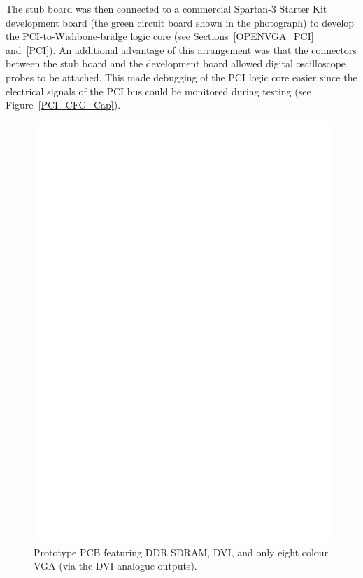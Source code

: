 The stub board was then connected to a commercial Spartan-3 Starter Kit
development board (the green circuit board shown in the photograph) to develop
the PCI-to-Wishbone-bridge logic core (see Sections~\ref{OPENVGA_PCI}
and~\ref{PCI}). An additional advantage of this arrangement was that the
connectors between the stub board and the development board allowed digital
oscilloscope probes to be attached. This made debugging of the PCI logic core
easier since the electrical signals of the PCI bus could be monitored during
testing (see Figure~\ref{PCI_CFG_Cap}).

\begin{figure}[h]
\begin{center}
\includegraphics[width=\linewidth]{images/FreeGA_orig.eps}
\caption[OpenVGA PCB version 2 with DDR SDRAM]{Prototype PCB featuring DDR
SDRAM, DVI, and only eight colour VGA (via the DVI analogue outputs).}
\label{OPENVGA_Version2}
\end{center}
\end{figure}

